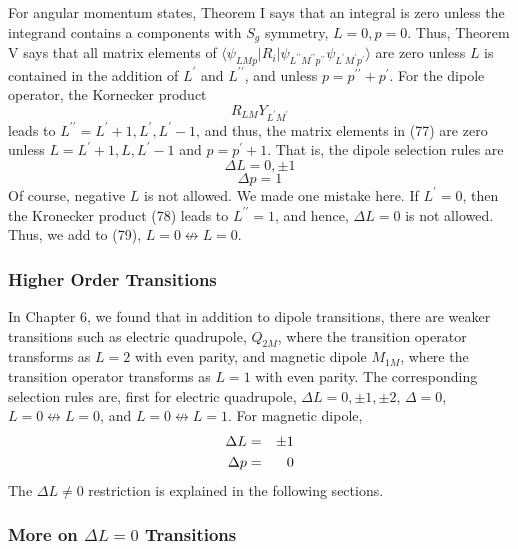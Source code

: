 For angular momentum states, Theorem I says that an integral is zero 
unless the integrand contains a components with $S_g$ symmetry, $L = 
0 , p = 0$.  Thus, Theorem V says that all matrix elements of 
$\langle \psi_{LMp} | R_i | \psi_{L^{\prime \prime}M^{\prime \prime}
p^{\prime \prime}} \psi_{L^{\prime}M^{\prime}p^{\prime}}
\rangle$ are zero unless $L$ is contained in the addition of 
$L^{\prime}$ and $L^{\prime \prime}$, and unless $p = p^{\prime 
\prime} + p^{\prime}$.  For the dipole operator, the Kornecker product
\begin{equation}
R_{LM} Y_{L^{\prime}M^{\prime}}
\label{chap16-eqno78}
\end{equation}
leads to $L^{\prime \prime} = L^{\prime} + 1 , L^{\prime} , 
L^{\prime} - 1$, and thus, the matrix elements in (77) are zero 
unless $L =  L^{\prime} + 1 , L ,  L^{\prime} - 1$ and $p = 
p^{\prime} + 1$.  That is, the dipole selection rules are
\begin{equation}
\Delta L = 0 , \pm 1
\label{chap16-eqno79a}
\end{equation}
\begin{equation}
\Delta p = 1
\label{chap16-eqno79b}
\end{equation}
Of course, negative $L$ is not allowed.  We made one mistake here.  
If $L^{\prime} = 0$, then the Kronecker product (78) leads to 
$L^{\prime \prime} = 1$, and hence, $\Delta L = 0$ is not allowed.  
Thus, we add to (79), $L = 0 {\not\leftrightarrow} L = 0$.

\subsubsection{Higher Order Transitions}

In Chapter 6, we found that in addition to dipole transitions, there 
are weaker transitions such as electric quadrupole, $Q_{2M}$, where 
the transition operator transforms as $L = 2$ with even parity, and 
magnetic dipole $M_{1M}$, where the transition operator transforms as 
$L = 1$ with even parity.  The corresponding selection rules are, 
first for electric quadrupole, $\Delta L = 0 , \pm 1 , \pm 2$, 
$\Delta = 0$, $L = 0 \not\leftrightarrow L = 0$, and $L = 0 
\not\leftrightarrow L = 1$.  For magnetic dipole, 
\begin{eqnarray}
\Delta L &=& \pm 1\cr
\Delta p &=& 0
\label{chap16-eqno80}
\end{eqnarray}
The $\Delta L \not= 0$ restriction is explained in the following 
sections.

\subsubsection{More on $\Delta L = 0$ Transitions}

